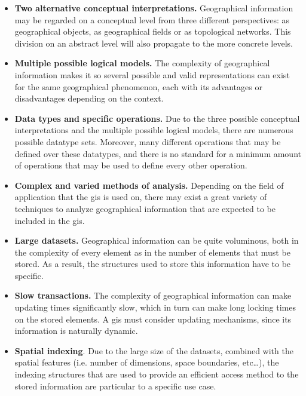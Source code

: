     \begin{itemize}
        \item \textbf{Two alternative conceptual interpretations.} Geographical information may be regarded on a conceptual level from three different perspectives: as geographical objects, as geographical fields or as topological networks. This division on an abstract level will also propagate to the more concrete levels.
        
        \item \textbf{Multiple possible logical models.} The complexity of geographical information makes it so several possible and valid representations can exist for the same geographical phenomenon, each with its advantages or disadvantages depending on the context.
        
        \item \textbf{Data types and specific operations.} Due to the three possible conceptual interpretations and the multiple possible logical models, there are numerous possible datatype sets. Moreover, many different operations that may be defined over these datatypes, and there is no standard for a minimum amount of operations that may be used to define every other operation.
        
        \item \textbf{Complex and varied methods of analysis.} Depending on the field of application that the \gls{gis} is used on, there may exist a great variety of techniques to analyze geographical information that are expected to be included in the \gls{gis}.
        
        \item \textbf{Large datasets.} Geographical information can be quite voluminous, both in the complexity of every element as in the number of elements that must be stored. As a result, the structures used to store this information have to be specific.
        
        \item \textbf{Slow transactions.} The complexity of geographical information can make updating times significantly slow, which in turn can make long locking times on the stored elements. A \gls{gis} must consider updating mechanisms, since its information is naturally dynamic.
        
        \item \textbf{Spatial indexing}. Due to the large size of the datasets, combined with the spatial features (i.e. number of dimensions, space boundaries, etc\dots), the indexing structures that are used to provide an efficient access method to the stored information are particular to a specific use case.
        

\end{itemize}
